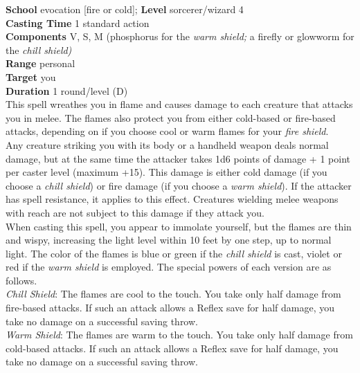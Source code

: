 \textbf{School} evocation [fire or cold]; \textbf{Level} sorcerer/wizard 4\\
\textbf{Casting Time} 1 standard action\\
\textbf{Components} V, S, M (phosphorus for the \textit{warm shield; }a firefly or glowworm for the \textit{chill shield)}\\
\textbf{Range} personal\\
\textbf{Target} you\\
\textbf{Duration} 1 round/level (D)\\
This spell wreathes you in flame and causes damage to each creature that attacks you in melee. The flames also protect you from either cold-based or fire-based attacks, depending on if you choose cool or warm flames for your \textit{fire shield}.\\
Any creature striking you with its body or a handheld weapon deals normal damage, but at the same time the attacker takes 1d6 points of damage + 1 point per caster level (maximum +15). This damage is either cold damage (if you choose a \textit{chill shield}) or fire damage (if you choose a \textit{warm shield}). If the attacker has spell resistance, it applies to this effect. Creatures wielding melee weapons with reach are not subject to this damage if they attack you.\\
When casting this spell, you appear to immolate yourself, but the flames are thin and wispy, increasing the light level within 10 feet by one step, up to normal light. The color of the flames is blue or green if the \textit{chill shield }is cast, violet or red if the \textit{warm shield }is employed. The special powers of each version are as follows.\\
\textit{Chill Shield}: The flames are cool to the touch. You take only half damage from fire-based attacks. If such an attack allows a Reflex save for half damage, you take no damage on a successful saving throw.\\
\textit{Warm Shield}: The flames are warm to the touch. You take only half damage from cold-based attacks. If such an attack allows a Reflex save for half damage, you take no damage on a successful saving throw.\\
